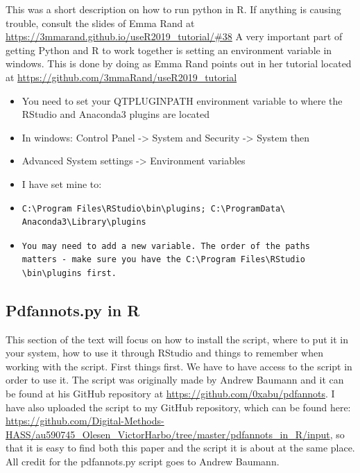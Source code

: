 \documentclass{article}
\begin{document}
This was a short description on how to run python in R. If anything is causing trouble, consult the slides of Emma Rand at \url{https://3mmarand.github.io/useR2019_tutorial/#38} \newline
A very important part of getting Python and R to work together is setting an environment variable in windows. This is done by doing as Emma Rand points out in her tutorial located at \url{https://github.com/3mmaRand/useR2019_tutorial}
\begin{itemize}
    \item You need to set your QT\textunderscore PLUGIN\textunderscore PATH environment variable to where the RStudio and Anaconda3 plugins are located
    \item In windows: Control Panel -> System and Security -> System then
    \item Advanced System settings -> Environment variables
    \item I have set mine to:
    \item \begin{verbatim}
C:\Program Files\RStudio\bin\plugins; C:\ProgramData\
Anaconda3\Library\plugins  
    \end{verbatim}
    \item \begin{verbatim}You may need to add a new variable. The order of the paths
matters - make sure you have the C:\Program Files\RStudio
\bin\plugins first.
    \end{verbatim}
\end{itemize}

\subsection{Pdfannots.py in R}
This section of the text will focus on how to install the script, where to put it in your system, how to use it through RStudio and things to remember when working with the script. First things first. We have to have access to the script in order to use it. The script was originally made by Andrew Baumann and it can be found at his GitHub repository at \url{https://github.com/0xabu/pdfannots}. I have also uploaded the script to my GitHub repository, which can be found here: \url{https://github.com/Digital-Methods-HASS/au590745_Olesen_VictorHarbo/tree/master/pdfannots_in_R/input}, so that it is easy to find both this paper and the script it is about at the same place. All credit for the pdfannots.py script goes to Andrew Baumann. 
\end{document}
